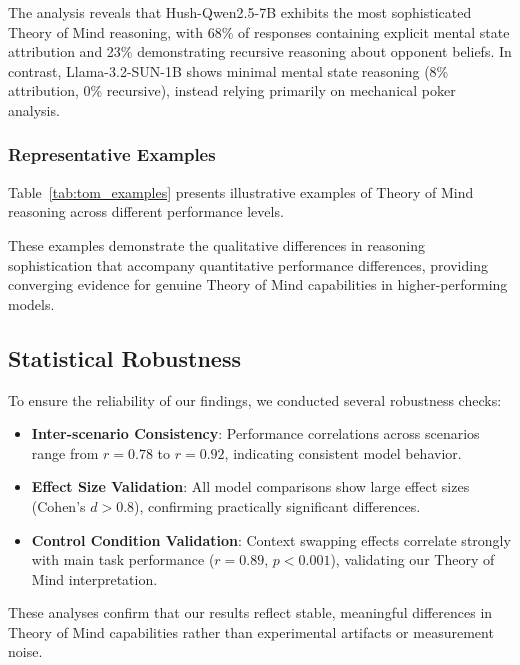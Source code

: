 The analysis reveals that Hush-Qwen2.5-7B exhibits the most sophisticated Theory of Mind reasoning, with 68\% of responses containing explicit mental state attribution and 23\% demonstrating recursive reasoning about opponent beliefs. In contrast, Llama-3.2-SUN-1B shows minimal mental state reasoning (8\% attribution, 0\% recursive), instead relying primarily on mechanical poker analysis.

\subsubsection{Representative Examples}

Table~\ref{tab:tom_examples} presents illustrative examples of Theory of Mind reasoning across different performance levels.



These examples demonstrate the qualitative differences in reasoning sophistication that accompany quantitative performance differences, providing converging evidence for genuine Theory of Mind capabilities in higher-performing models.

\subsection{Statistical Robustness}
\label{subsec:statistical_robustness}

To ensure the reliability of our findings, we conducted several robustness checks:

\begin{itemize}
    \item \textbf{Inter-scenario Consistency}: Performance correlations across scenarios range from $r = 0.78$ to $r = 0.92$, indicating consistent model behavior.
    
    \item \textbf{Effect Size Validation}: All model comparisons show large effect sizes (Cohen's $d > 0.8$), confirming practically significant differences.
    
    \item \textbf{Control Condition Validation}: Context swapping effects correlate strongly with main task performance ($r = 0.89$, $p < 0.001$), validating our Theory of Mind interpretation.
\end{itemize}

These analyses confirm that our results reflect stable, meaningful differences in Theory of Mind capabilities rather than experimental artifacts or measurement noise. 